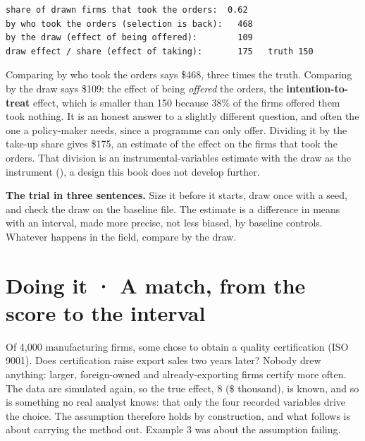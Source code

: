 \documentclass[
  letterpaper,
  10pt,
  twoside,
  openright,
  numbers=noenddot,
  chapterprefix=true]{scrbook}
\begin{document}
\begin{verbatim}
share of drawn firms that took the orders:  0.62
by who took the orders (selection is back):   468
by the draw (effect of being offered):        109
draw effect / share (effect of taking):       175   truth 150
\end{verbatim}

Comparing by who took the orders says \$468, three times the truth.
Comparing by the draw says \$109: the effect of being \emph{offered} the
orders, the \textbf{intention-to-treat} effect, which is smaller than
150 because 38\% of the firms offered them took nothing. It is an honest
answer to a slightly different question, and often the one a
policy-maker needs, since a programme can only offer. Dividing it by the
take-up share gives \$175, an estimate of the effect on the firms that
took the orders. That division is an instrumental-variables estimate
with the draw as the instrument (), a design this book does not develop
further.

\textbf{The trial in three sentences.} Size it before it starts, draw
once with a seed, and check the draw on the baseline file. The estimate
is a difference in means with an interval, made more precise, not less
biased, by baseline controls. Whatever happens in the field, compare by
the draw.

\section{Doing it · A match, from the score to the
interval}\label{doing-it-a-match-from-the-score-to-the-interval}

Of 4,000 manufacturing firms, some chose to obtain a quality
certification (ISO 9001). Does certification raise export sales two
years later? Nobody drew anything: larger, foreign-owned and
already-exporting firms certify more often. The data are simulated
again, so the true effect, 8 (\$ thousand), is known, and so is
something no real analyst knows: that only the four recorded variables
drive the choice. The assumption therefore holds by construction, and
what follows is about carrying the method out. Example 3 was about the
assumption failing.
\end{document}
